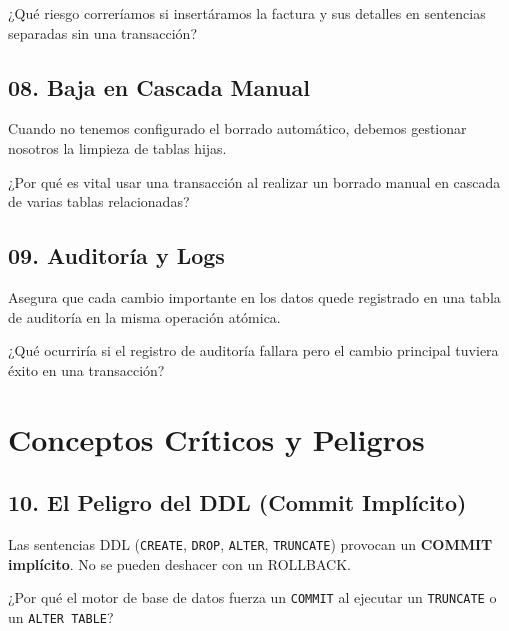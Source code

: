 \documentclass[12pt,a4paper]{article}
\begin{document}
\begin{tcolorbox}[title=Reflexión 7]
¿Qué riesgo correríamos si insertáramos la factura y sus detalles en sentencias separadas sin una transacción?
\end{tcolorbox}

\subsection{08. Baja en Cascada Manual}
Cuando no tenemos configurado el borrado automático, debemos gestionar nosotros la limpieza de tablas hijas.


\begin{tcolorbox}[title=Reflexión 8]
¿Por qué es vital usar una transacción al realizar un borrado manual en cascada de varias tablas relacionadas?
\end{tcolorbox}

\subsection{09. Auditoría y Logs}
Asegura que cada cambio importante en los datos quede registrado en una tabla de auditoría en la misma operación atómica.


\begin{tcolorbox}[title=Reflexión 9]
¿Qué ocurriría si el registro de auditoría fallara pero el cambio principal tuviera éxito en una transacción?
\end{tcolorbox}

\section{Conceptos Críticos y Peligros}

\subsection{10. El Peligro del DDL (Commit Implícito)}
\begin{tcolorbox}[title=¡Atención!]
Las sentencias DDL (\texttt{CREATE}, \texttt{DROP}, \texttt{ALTER}, \texttt{TRUNCATE}) provocan un \textbf{COMMIT implícito}. No se pueden deshacer con un ROLLBACK.
\end{tcolorbox}


\begin{tcolorbox}[title=Reflexión 10]
¿Por qué el motor de base de datos fuerza un \texttt{COMMIT} al ejecutar un \texttt{TRUNCATE} o un \texttt{ALTER TABLE}?
\end{tcolorbox}
\end{document}
